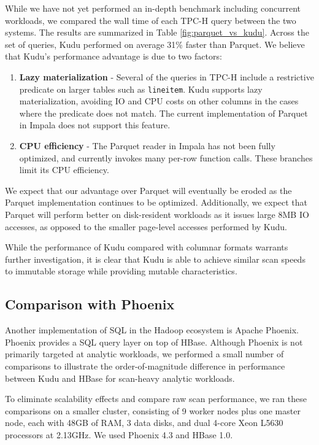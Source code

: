 \documentclass[twocolumn,9pt]{article}
\begin{document}
While we have not yet performed an in-depth benchmark including concurrent workloads, we compared
the wall time of each TPC-H query between the two systems. The results are summarized in Table \ref{fig:parquet_vs_kudu}.
Across the set of queries, Kudu performed on average 31\% faster than Parquet. We believe that Kudu's performance
advantage is due to two factors:
\begin{enumerate}
\item {\bf Lazy materialization} - Several of the queries in TPC-H include a restrictive predicate
  on larger tables such as {\tt lineitem}. Kudu supports lazy materialization, avoiding IO and
  CPU costs on other columns in the cases where the predicate does not match. The current
  implementation of Parquet in Impala does not support this feature.
\item {\bf CPU efficiency} - The Parquet reader in Impala has not been fully optimized,
  and currently invokes many per-row function calls. These branches limit its CPU efficiency.
\end{enumerate}

We expect that our advantage over Parquet will eventually be eroded as the Parquet implementation
continues to be optimized. Additionally, we expect that Parquet will perform better on disk-resident
workloads as it issues large 8MB IO accesses, as opposed to the smaller page-level accesses performed by Kudu.

While the performance of Kudu compared with columnar formats warrants further investigation, it is clear that
Kudu is able to achieve similar scan speeds to immutable storage while providing mutable characteristics.

\subsection{Comparison with Phoenix}
\label{sec:phoenix}

Another implementation of SQL in the Hadoop ecosystem is Apache Phoenix\cite{phoenix}. Phoenix
provides a SQL query layer on top of HBase. Although Phoenix is not primarily
targeted at analytic workloads, we performed a small number of comparisons to illustrate the
order-of-magnitude difference in performance between Kudu and HBase for scan-heavy analytic
workloads.

To eliminate scalability effects and compare raw scan performance, we ran these comparisons on
a smaller cluster, consisting of 9 worker nodes plus one master node, each with
48GB of RAM, 3 data disks, and dual 4-core Xeon L5630 processors at 2.13GHz.
We used Phoenix 4.3 and HBase 1.0.
\end{document}
